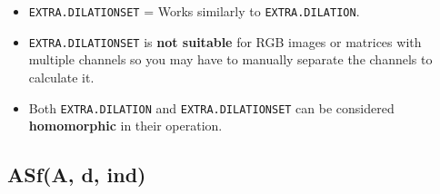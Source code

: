 \documentclass[11pt]{amsart}
\theoremstyle{remark}
\providecommand{\tightlist}{%
  \setlength{\itemsep}{0pt}\setlength{\parskip}{0pt}}
\theoremstyle{definition}
\theoremstyle{remark}
\numberwithin{equation}{section}
\begin{document}
\begin{itemize}
\tightlist
\item
  \texttt{EXTRA.DILATIONSET} = Works similarly to
  \texttt{EXTRA.DILATION}.
\item
  \texttt{EXTRA.DILATIONSET} is \textbf{not suitable} for RGB images or
  matrices with multiple channels so you may have to manually separate
  the channels to calculate it.
\item
  Both \texttt{EXTRA.DILATION} and \texttt{EXTRA.DILATIONSET} can be
  considered \textbf{homomorphic} in their operation.
\end{itemize}

\subsection{ASf(A, d, ind)}\label{asfa-d-ind}
\end{document}
